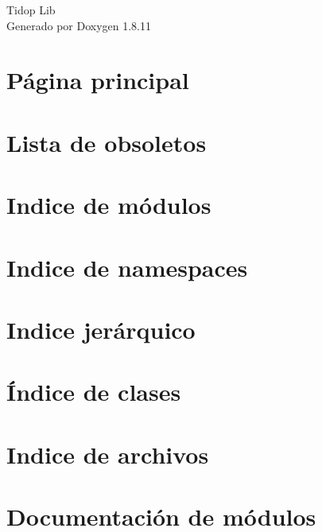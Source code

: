 \documentclass[twoside]{book}
\newcommand{\+}{\discretionary{\mbox{\scriptsize$\hookleftarrow$}}{}{}}
\newcommand{\clearemptydoublepage}{%
  \newpage{\pagestyle{empty}\cleardoublepage}%
}
\begin{document}
\hypersetup{pageanchor=false,
             bookmarksnumbered=true,
             pdfencoding=unicode
            }
\begin{titlepage}
\vspace*{7cm}
\begin{center}%
{\Large Tidop Lib }\\
\vspace*{1cm}
{\large Generado por Doxygen 1.8.11}\\
\end{center}
\end{titlepage}
\clearemptydoublepage
\tableofcontents
\clearemptydoublepage
{}
\hypersetup{pageanchor=true}

\chapter{Página principal}
\label{index}\hypertarget{index}{}
\chapter{Lista de obsoletos}
\label{deprecated}
\hypertarget{deprecated}{}

\chapter{Indice de módulos}

\chapter{Indice de namespaces}

\chapter{Indice jerárquico}

\chapter{Índice de clases}

\chapter{Indice de archivos}

\chapter{Documentación de módulos}







\end{document}

